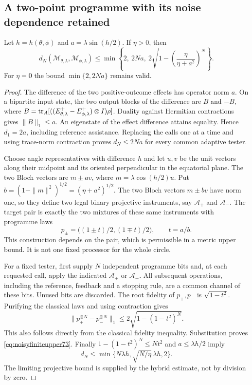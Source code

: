 \subsection{A two-point programme with its noise dependence retained}
\begin{lemma}\label{lem:noisyupper73}
Let $h=h(\theta,\phi)$ and $a=\lambda\sin(h/2)$. If $\eta>0$, then
\begin{equation}\label{eq:noisyfiniteupper73}
 d_N(\mathcal M_{\theta,\lambda},\mathcal M_{\phi,\lambda})
 \le\min\left\{2,\ 2Na,\
             2\sqrt{1-\left(\frac{\eta}{\eta+a^2}\right)^N}\right\}.
\end{equation}
For $\eta=0$ the bound $\min\{2,2Na\}$ remains valid.
\end{lemma}
\begin{proof}
The difference of the two positive-outcome effects has operator norm
$a$. On a bipartite input state, the two output blocks of the difference
are $B$ and $-B$, where
$B=\operatorname{tr}_A[((E^+_{\theta,\lambda}-E^+_{\phi,\lambda})\otimes I)\rho]$.
Duality against Hermitian contractions gives $\|B\|_1\le a$.
An eigenstate of the effect difference attains equality. Hence
$d_1=2a$, including reference assistance. Replacing the calls one at a
time and using trace-norm contraction proves $d_N\le2Na$ for every
common adaptive tester.

Choose angle representatives with difference $h$ and let $u,v$ be the
unit vectors along their midpoint and its oriented perpendicular in
the equatorial plane. The two Bloch vectors are $m\pm av$, where
$m=\lambda\cos(h/2)u$. Put
$b=(1-\|m\|^2)^{1/2}=(\eta+a^2)^{1/2}$.
The two Bloch vectors $m\pm bv$ have norm one, so they define two legal
binary projective instruments, say $\mathcal A_+$ and $\mathcal A_-$.
The target pair is exactly the two mixtures of these same instruments
with programme laws
\[
 p_\pm=\bigl((1\pm t)/2,(1\mp t)/2\bigr),\qquad t=a/b.
\]
This construction depends on the pair, which is permissible in a
metric upper bound. It is not one fixed processor for the whole circle.

For a fixed tester, first supply $N$ independent programme bits and,
at each requested call, apply the indicated $\mathcal A_+$ or
$\mathcal A_-$. All subsequent operations, including the reference,
feedback and a stopping rule, are a common channel of these bits.
Unused bits are discarded. The root fidelity of $p_+,p_-$ is
$\sqrt{1-t^2}$. Purifying the classical laws and using contraction gives
\[
 \|p_+^{\otimes N}-p_-^{\otimes N}\|_1
 \le2\sqrt{1-(1-t^2)^N}.
\]
This also follows directly from the classical fidelity inequality.
Substitution proves \eqref{eq:noisyfiniteupper73}.
Finally $1-(1-t^2)^N\le Nt^2$ and $a\le\lambda h/2$ imply
\[
 d_N\le\min\{N\lambda h,\sqrt{N/\eta}\,\lambda h,2\}.
\]
The limiting projective bound is supplied by the hybrid estimate,
not by division by zero.
\end{proof}
